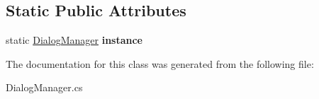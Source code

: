 \subsection*{Static Public Attributes}
\begin{DoxyCompactItemize}
\item 
\mbox{\label{class_dialog_manager_a899d69bf4bcb09e83938d343aaa79776}} 
static \mbox{\hyperlink{class_dialog_manager}{Dialog\+Manager}} {\bfseries instance}
\end{DoxyCompactItemize}


The documentation for this class was generated from the following file\+:\begin{DoxyCompactItemize}
\item 
Dialog\+Manager.\+cs\end{DoxyCompactItemize}
